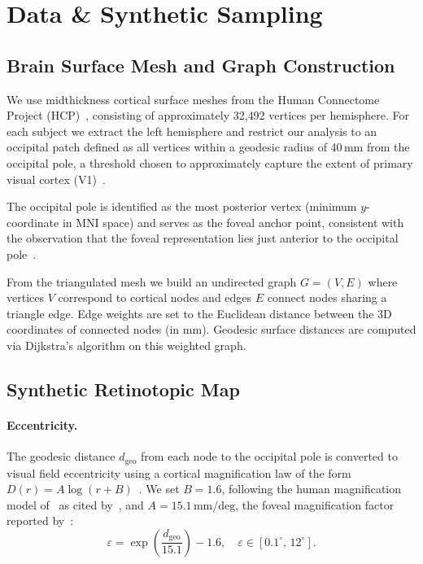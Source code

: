 \section{Data \& Synthetic Sampling}
\label{sec:data}

\subsection{Brain Surface Mesh and Graph Construction}

We use midthickness cortical surface meshes from the Human Connectome Project (HCP)~\cite{vanessen2013hcp},
consisting of approximately 32{,}492 vertices per hemisphere.
For each subject we extract the left hemisphere and restrict our analysis to an occipital patch
defined as all vertices within a geodesic radius of 40\,mm from the occipital pole, a threshold
chosen to approximately capture the extent of primary visual cortex (V1)~\cite{wandell2007}.

The occipital pole is identified as the most posterior vertex (minimum $y$-coordinate in MNI space)
and serves as the foveal anchor point, consistent with the observation that the foveal representation
lies just anterior to the occipital pole~\cite{sereno1995borders}.

From the triangulated mesh we build an undirected graph $G = (V, E)$ where vertices $V$ correspond to
cortical nodes and edges $E$ connect nodes sharing a triangle edge.
Edge weights are set to the Euclidean distance between the 3D coordinates of connected nodes (in mm).
Geodesic surface distances are computed via Dijkstra's algorithm on this weighted graph.

\subsection{Synthetic Retinotopic Map}

\paragraph{Eccentricity.}
The geodesic distance $d_\text{geo}$ from each node to the occipital pole is converted to
visual field eccentricity using a cortical magnification law of the form $D(r) = A\log(r+B)$~\cite{schwartz1980}.
We set $B = 1.6$, following the human magnification model of~\citet{drasdo1977} as cited by~\citet{schwartz1980},
and $A = 15.1\,\text{mm/deg}$, the foveal magnification factor reported by~\citet{cowey1974}:
\begin{equation}
  \varepsilon = \exp\!\left(\frac{d_\text{geo}}{15.1}\right) - 1.6,
  \quad \varepsilon \in [0.1^\circ,\, 12^\circ].
\end{equation}

